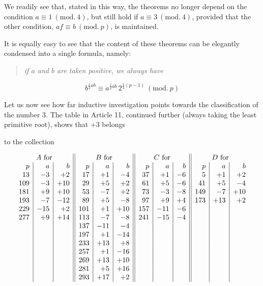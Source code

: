We readily see that, stated in this way, the theorems no longer depend on the condition $a\equiv1\ (\mathrm{mod.}\ 4)$, but still hold if $a\equiv3\ (\mathrm{mod.}\ 4)$, provided that the other condition, $af\equiv b\ (\mathrm{mod.}\ p)$, is maintained.

It is equally easy to see that the content of these theorems can be elegantly condensed into a single formula, namely:
\begin{quote}\itshape if $a$ and $b$ are taken positive, we always have\end{quote}
\[
b^{\frac12ab}\equiv a^{\frac12ab}\,2^{\frac14(p-1)}\ (\mathrm{mod.}\ p)
\]

Let us now see how far inductive investigation points towards the classification of the number $3$. The table in Article 11, continued further (always taking the least primitive root), shows that $+3$ belongs
\begin{center}to the collection\end{center}
\[
\begin{array}{r|r|r||r|r|r||r|r|r||r|r|r}
\multicolumn{3}{c||}{A\ \text{for}}&\multicolumn{3}{c||}{B\ \text{for}}&\multicolumn{3}{c||}{C\ \text{for}}&\multicolumn{3}{c}{D\ \text{for}}\\
p&a&b&p&a&b&p&a&b&p&a&b\\
13&-3&+2&17&+1&-4&37&+1&-6&5&+1&+2\\
109&-3&+10&29&+5&+2&61&+5&-6&41&+5&-4\\
181&+9&+10&53&-7&+2&73&-3&-8&149&-7&+10\\
193&-7&-12&89&+5&-8&97&+9&+4&173&+13&+2\\
229&-15&+2&101&+1&+10&157&-11&-6&&&\\
277&+9&+14&113&-7&-8&241&-15&-4&&&\\
&&&137&-11&-4&&&&&&\\
&&&197&+1&-14&&&&&&\\
&&&233&+13&+8&&&&&&\\
&&&257&+1&-16&&&&&&\\
&&&269&+13&+10&&&&&&\\
&&&281&+5&+16&&&&&&\\
&&&293&+17&+2&&&&&&
\end{array}
\]

